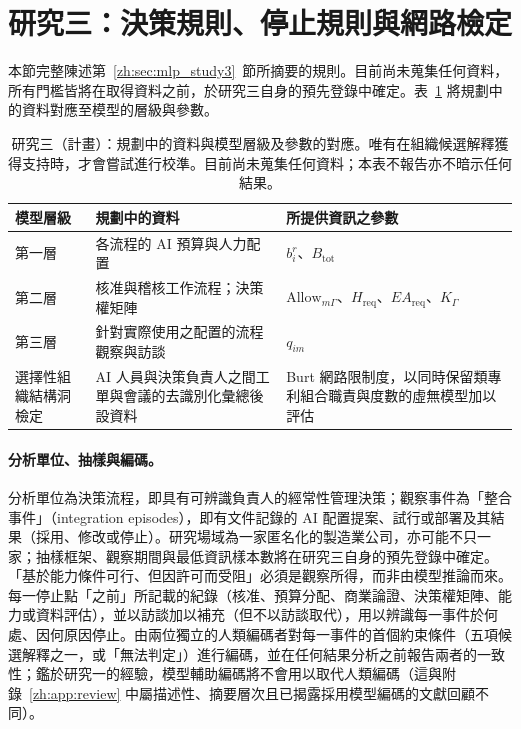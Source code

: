 \section{研究三：決策規則、停止規則與網路檢定}
\label{zh:app:study3}

本節完整陳述第~\ref{zh:sec:mlp_study3}~節所摘要的規則。目前尚未蒐集任何資料，所有門檻皆將在取得資料之前，於研究三自身的預先登錄中確定。表~\ref{zh:tab:back_study3} 將規劃中的資料對應至模型的層級與參數。

\begin{table}[tbp]
\centering
\caption{研究三（計畫）：規劃中的資料與模型層級及參數的對應。唯有在組織候選解釋獲得支持時，才會嘗試進行校準。目前尚未蒐集任何資料；本表不報告亦不暗示任何結果。}
\label{zh:tab:back_study3}
\footnotesize
\begin{tabular}{p{2.6cm}p{6.2cm}p{5.4cm}}
\toprule
模型層級 & 規劃中的資料 & 所提供資訊之參數 \tabularnewline
\midrule
\raggedright 第一層 & \raggedright 各流程的 AI 預算與人力配置 & \raggedright $b_i^r$、$B_{\mathrm{tot}}$ \tabularnewline
\raggedright 第二層 & \raggedright 核准與稽核工作流程；決策權矩陣 & \raggedright $\mathrm{Allow}_{m\Gamma}$、$H_{\mathrm{req}}$、$EA_{\mathrm{req}}$、$K_\Gamma$ \tabularnewline
\raggedright 第三層 & \raggedright 針對實際使用之配置的流程觀察與訪談 & \raggedright $q_{im}$ \tabularnewline
\raggedright 選擇性組織結構洞檢定 & \raggedright AI 人員與決策負責人之間工單與會議的去識別化彙總後設資料 & \raggedright Burt 網路限制度，以同時保留類專利組合職責與度數的虛無模型加以評估 \tabularnewline
\bottomrule
\end{tabular}
\end{table}

\paragraph{分析單位、抽樣與編碼。}分析單位為決策流程，即具有可辨識負責人的經常性管理決策；觀察事件為「整合事件」（integration episodes），即有文件記錄的 AI 配置提案、試行或部署及其結果（採用、修改或停止）。研究場域為一家匿名化的製造業公司，亦可能不只一家；抽樣框架、觀察期間與最低資訊樣本數將在研究三自身的預先登錄中確定。「基於能力條件可行、但因許可而受阻」必須是觀察所得，而非由模型推論而來。每一停止點「之前」所記載的紀錄（核准、預算分配、商業論證、決策權矩陣、能力或資料評估），並以訪談加以補充（但不以訪談取代），用以辨識每一事件於何處、因何原因停止。由兩位獨立的人類編碼者對每一事件的首個約束條件（五項候選解釋之一，或「無法判定」）進行編碼，並在任何結果分析之前報告兩者的一致性；鑑於研究一的經驗，模型輔助編碼將不會用以取代人類編碼（這與附錄~\ref{zh:app:review} 中屬描述性、摘要層次且已揭露採用模型編碼的文獻回顧不同）。

